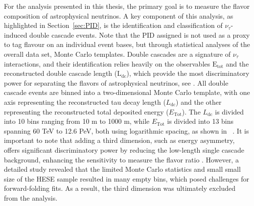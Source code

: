 For the analysis presented in this thesis, the primary goal is to measure the flavor composition of astrophysical neutrinos. A key component of this analysis, as highlighted in Section~\ref{sec:PID}, is the identification and classification of $\nu_\tau$-induced double cascade events. Note that the PID assigned is not used as a proxy to tag flavour on an individual event bases, but through statistical analyses of the overall data set, Monte Carlo templates. Double cascades are a signature of $\nu_\tau$ interactions, and their identification relies heavily on the observables $\mathrm{E}_\mathrm{tot}$ and the reconstructed double cascade length ($\mathrm{L}_{\text{dc}}$), which provide the most discriminatory power for separating the flavors of astrophysical neutrinos, see . All double cascade events are binned into a two-dimensional Monte Carlo template, with one axis representing the reconstructed tau decay length ($L_{\text{dc}}$) and the other representing the reconstructed total deposited energy ($E_{\text{Tot}}$). The $L_{\text{dc}}$ is divided into 10 bins ranging from 10 m to 1000 m, while $E_{\text{Tot}}$ is divided into 13 bins spanning 60 TeV to 12.6 PeV, both using logarithmic spacing, as shown in ~. It is important to note that adding a third dimension, such as energy asymmetry, offers significant discriminatory power by reducing the low-length single cascade background, enhancing the sensitivity to measure the flavor ratio . However, a detailed study revealed that the limited Monte Carlo statistics and small small size of the HESE sample resulted in many empty bins, which posed challenges for forward-folding fits. As a result, the third dimension was ultimately excluded from the analysis.


